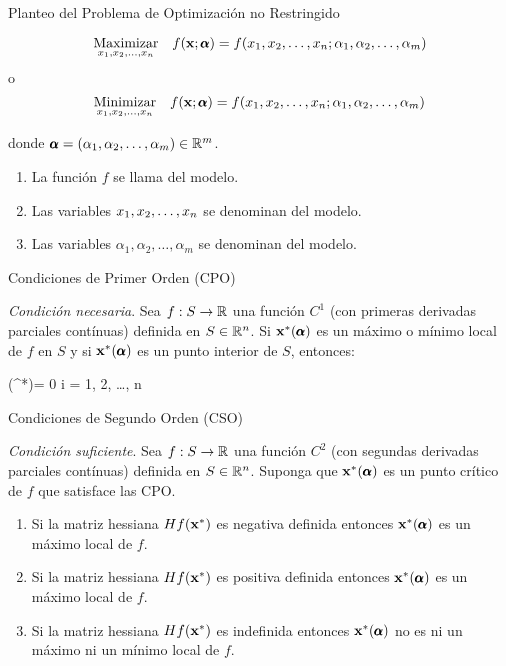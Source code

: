 \documentclass[10pt,aspectratio=169]{beamer}  %
\begin{document}
\begin{frame}{Planteo del Problema de Optimización no Restringido}
	
	\[
		\underset{x_1, x_2, \dots, x_n}{\mathrm{Maximizar}} \quad  f(\mathbf{x}; \pmb{\alpha}) = f(x_1, x_2, \dots, x_n; \alpha_1, \alpha_2, \dots, \alpha_m)
	\]
	o
	\[
		\underset{x_1, x_2, \dots, x_n}{\mathrm{Minimizar}} \quad  f(\mathbf{x}; \pmb{\alpha}) = f(x_1, x_2, \dots, x_n; \alpha_1, \alpha_2, \dots, \alpha_m)
	\]
	
	donde $\pmb{\alpha} = (\alpha_1, \alpha_2, \dots, \alpha_m) \in \mathbb{R}^m$.
	\vspace{5pt}
	\begin{enumerate}
		\item La función $f$ se llama  del modelo.
		\item Las variables $x_1, x_2, \dots, x_n$ se denominan  del modelo.
		\item Las variables $\alpha_1, \alpha_2, \dots, \alpha_m$ se denominan  del modelo.
	\end{enumerate}

\end{frame}

\begin{frame}{Condiciones de Primer Orden (CPO)}
	
	\textit{Condición necesaria}. Sea $f: S \rightarrow \mathbb{R}$ una función $C^1$ (con primeras derivadas parciales contínuas) definida en $S \in \mathbb{R}^n$.
	Si $\mathbf{x}^*(\pmb{\alpha})$ es un máximo o mínimo local de $f$ en $S$ y si $\mathbf{x}^*(\pmb{\alpha})$ es un punto interior
	de $S$, entonces:

	\begin{myequation}
		(\vx^*)= 0 \quad {} i = 1, 2, \dots, n
	\end{myequation}


\end{frame}

\begin{frame}{Condiciones de Segundo Orden (CSO)}
	
	\textit{Condición suficiente}. Sea $f: S \rightarrow \mathbb{R}$ una función $C^2$ (con segundas derivadas parciales contínuas)
	definida en $S \in \mathbb{R}^n$. Suponga que $\mathbf{x}^*(\pmb{\alpha})$ es un punto crítico de $f$ que satisface las CPO.
	
	\begin{enumerate}
		\item Si la matriz hessiana $Hf(\mathbf{x}^*)$ es negativa definida entonces $\mathbf{x}^*(\pmb{\alpha})$ es un máximo
		local de $f$. 
		\item Si la matriz hessiana $Hf(\mathbf{x}^*)$ es positiva definida entonces $\mathbf{x}^*(\pmb{\alpha})$ es un máximo
		local de $f$.
		\item Si la matriz hessiana $Hf(\mathbf{x}^*)$ es indefinida entonces $\mathbf{x}^*(\pmb{\alpha})$ no es ni un máximo ni
		un mínimo local de $f$. 
	\end{enumerate}

\end{frame}
\end{document}
